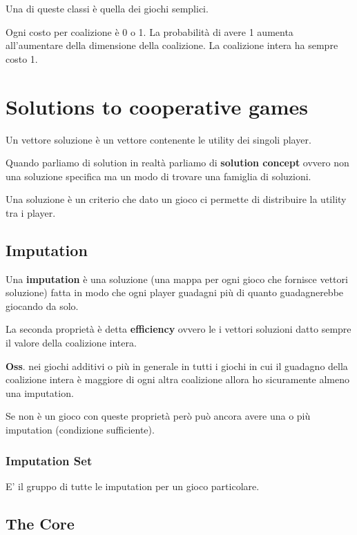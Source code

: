 \documentclass[10pt,a4paper]{report}
\begin{document}
        Una di queste classi è quella dei giochi semplici.

        Ogni costo per coalizione è 0 o 1. La probabilità di avere 1 aumenta all'aumentare della dimensione della coalizione. La coalizione intera ha sempre costo 1.

        \section{Solutions to cooperative games}

        Un vettore soluzione è un vettore contenente le utility dei singoli player.

        Quando parliamo di solution in realtà parliamo di \textbf{solution concept} ovvero non una soluzione specifica ma un modo di trovare una famiglia di soluzioni.

        Una soluzione è un criterio che dato un gioco ci permette di distribuire la utility tra i player.

        \subsection{Imputation}

        Una \textbf{imputation} è una soluzione (una mappa per ogni gioco che fornisce vettori soluzione) fatta in modo che ogni player guadagni più di quanto guadagnerebbe giocando da solo.

        La seconda proprietà è detta \textbf{efficiency} ovvero le i vettori soluzioni datto sempre il valore della coalizione intera.

        \textbf{Oss}. nei giochi additivi o più in generale in tutti i giochi in cui il guadagno della coalizione intera è maggiore di ogni altra coalizione allora ho sicuramente almeno una imputation.

        Se non è un gioco con queste proprietà però può ancora avere una o più imputation (condizione sufficiente).

        \subsubsection{Imputation Set}

        E' il gruppo di tutte le imputation per un gioco particolare. 

        \subsection{The Core}
\end{document}
